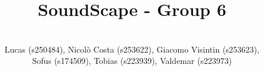 \documentclass[conference,letterpaper]{IEEEtran}
\begin{document}

\title{SoundScape - Group 6\\
}
\author{
 \\
Lucas (s250484),
Nicolò Costa (s253622),
Giacomo Visintin (s253623), \\
Sofus (s174509),
Tobias (s223939),
Valdemar (s223973)
}
\maketitle








\end{document}
